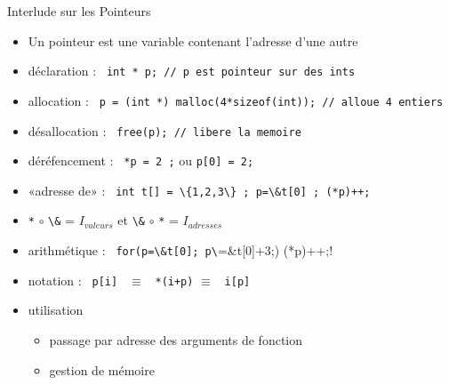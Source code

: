 \documentclass[11pt,mathserif]{beamer}
\newcommand{\scout}{\faAngellist}
\newcommand{\argi}{\faLightbulbO}
\newif\ifC
\begin{document}
\ifC
\begin{frame}{Interlude sur les Pointeurs}
\begin{itemize}[<+->]
  \item Un pointeur est une variable contenant l'adresse d'une autre
  \item déclaration : \lstinline! int * p; // p est pointeur sur des ints !
  \item allocation  : \lstinline! p = (int *) malloc(4*sizeof(int)); // alloue 4 entiers !
  \item désallocation : \lstinline! free(p); // libere la memoire !
  \item déréfencement : \lstinline! *p = 2 ;! ou \lstinline !p[0] = 2;!
  \item «adresse de» : \lstinline! int t[] = \{1,2,3\} ; p=\&t[0] ; (*p)++;!
  \item[\argi] \lstinline!*! $\circ$ \lstinline!\&! = $I_{valeurs}$ et \lstinline!\&! $\circ$ \lstinline!*! = $I_{adresses}$
  \item arithmétique : \lstinline! for(p=\&t[0]; p\!=\&t[0]+3;) (*p)++;!
  \item[\scout] notation : \lstinline! p[i] ! $\equiv$ \lstinline! *(i+p)! $\equiv$ \lstinline! i[p]!
  \item utilisation 
    \begin{itemize}
      \item passage par adresse des arguments de fonction
      \item gestion de mémoire
    \end{itemize}
\end{itemize}
\end{frame}
\end{document}

